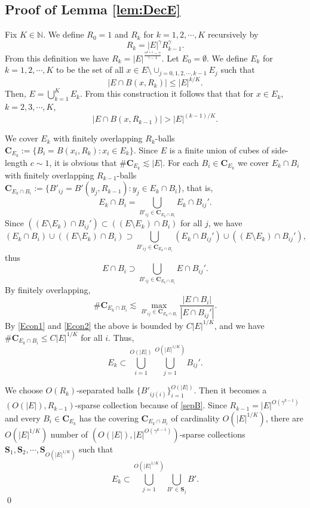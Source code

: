 \documentclass[11pt,reqno]{amsart}
\theoremstyle{plain}
\theoremstyle{definition}
\theoremstyle{remark}
\numberwithin{equation}{section}
\begin{document}
\subsection{Proof of Lemma \ref{lem:DecE}}
Fix $K \in \mathbb N$. We define $R_0=1$ and $R_k$ for $k=1,2,\cdots, K$ recursively by 
\begin{equation} \label{sepB}
R_{k} = |E|^{\gamma} R_{k-1}^{\gamma}.
\end{equation}
From this definition we have $R_k = |E|^{\frac{\gamma^{k+1}-\gamma}{\gamma-1}}$. Let  $E_0 = \emptyset$. We define $E_k$ for $k=1,2,\cdots, K$ to be the set of all $x \in E \setminus \cup_{j=0,1,2,\cdots,k-1} E_j$ such that
\begin{equation} \label{Econ1}
|E \cap B(x, R_k)| \le |E|^{k/K}.
\end{equation}
Then, $E = \bigcup_{k=1}^{K} E_k$. From this construction it follows that that for $x \in E_k$, $k=2,3, \cdots, K$,
\begin{equation} \label{Econ2}
|E \cap B(x, R_{k-1})| > |E|^{(k-1)/K}.
\end{equation}

We cover $E_k$ with finitely overlapping $R_k$-balls $\mathbf C_{E_k} := \{B_i=B(x_i,R_k): x_i \in E_k\}$.
Since $E$ is a finite union of cubes of side-length $c \sim 1$, it is obvious that $\#\mathbf C_{E_k} \lesssim |E|$. For each $B_i \in \mathbf C_{E_k}$ we cover $E_k \cap B_i$ with finitely overlapping $R_{k-1}$-balls $\mathbf C_{E_k \cap B_i} :=\{B'_{ij}=B'(y_j, R_{k-1}):y_j \in E_k \cap B_i \}$, that is,
\[
E_k \cap B_i = \bigcup_{B'_{ij} \in \mathbf C_{E_k \cap B_i}} E_k \cap B_{ij}'.
\]
Since $((E  \setminus E_k) \cap B_{ij}') \subset ((E  \setminus E_k) \cap B_{i})$ for all $j$, we have
\[
(E_k \cap B_i)  \cup ((E  \setminus E_k) \cap B_{i}) \supset \bigcup_{B'_{ij} \in \mathbf C_{E_k \cap B_i}} (E_k \cap B_{ij}') \cup ((E  \setminus E_k) \cap B_{ij}'),
\]
thus
\[
E \cap B_i \supset \bigcup_{B'_{ij} \in \mathbf C_{E_k \cap B_i}} E \cap B_{ij}'.
\]
By finitely overlapping,
\[
\# \mathbf C_{E_k \cap B_i} \lesssim \max_{B'_{ij} \in \mathbf C_{E_k \cap B_i}} \frac{|E \cap B_i|}{|E \cap B_{ij}'|}.
\]
By \eqref{Econ1} and \eqref{Econ2} the above is bounded by $C|E|^{1/K}$, and we have $\#\mathbf C_{E_k \cap B_i} \le C|E|^{1/K}$ for all $i$.
Thus,
\[
E_k \subset \bigcup_{i=1}^{O(|E|)} \bigcup_{j=1}^{O(|E|^{1/K})} B_{ij}'.
\] 

We choose $O(R_k)$-separated balls $\{B'_{ij(i)}\}_{i=1}^{O(|E|)}$. Then it becomes a $(O(|E|), R_{k-1})$-sparse collection because of \eqref{sepB}. Since $R_{k-1} = |E|^{O(\gamma^{k-1})}$ and every $B_i \in \mathbf C_{E_k}$ has the covering $\mathbf C_{E_k \cap B_i}$ of cardinality $O(|E|^{1/K})$, there are $O(|E|^{1/K})$ number of $(O(|E|), |E|^{O(\gamma^{k-1})})$-sparse collections $\mathbf S_1, \mathbf S_2, \cdots, \mathbf S_{O(|E|^{1/K})}$ such that 
\[
E_k \subset \bigcup_{j=1}^{O(|E|^{1/K})} \bigcup_{B' \in \mathbf S_j} B'.
\]
\qed
\end{document}

